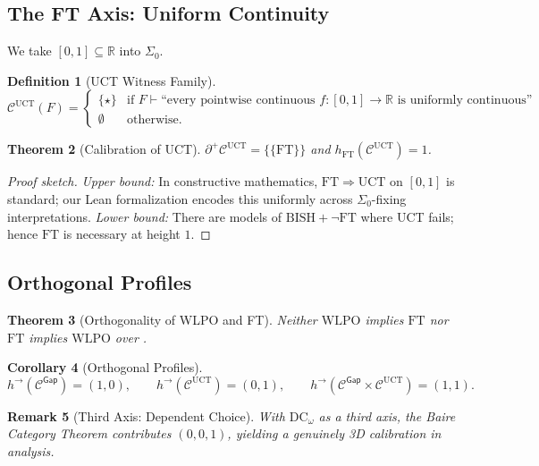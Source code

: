 \documentclass[11pt]{article}
\newtheorem{theorem}{Theorem}[section]
\newtheorem{definition}[theorem]{Definition}
\newtheorem{corollary}[theorem]{Corollary}
\newtheorem{remark}[theorem]{Remark}
\newcommand{\R}{\mathbb{R}}
\newcommand{\WLPO}{\mathrm{WLPO}}
\newcommand{\FT}{\mathrm{FT}}
\newcommand{\UCT}{\mathrm{UCT}}
\newcommand{\DCw}{\mathrm{DC}_\omega}
\newcommand{\BISH}{\mathrm{BISH}}
\newcommand{\SigmaZero}{\Sigma_{0}}
\newcommand{\Frontierpos}{\partial^{+}}
\begin{document}
\subsection{The FT Axis: Uniform Continuity}

We take $[0,1]\subseteq\R$ into $\SigmaZero$.

\begin{definition}[UCT Witness Family]
\[
\mathcal{C}^{\mathrm{UCT}}(F) =
\begin{cases}
\{\star\} & \text{if } F \vdash \text{``every pointwise continuous } f:[0,1]\to\R \text{ is uniformly continuous''} \\
\emptyset & \text{otherwise.}
\end{cases}
\]
\end{definition}

\begin{theorem}[Calibration of UCT]\label{thm:uct-calibration}
$\Frontierpos\mathcal{C}^{\mathrm{UCT}} = \{\{\FT\}\}$ and $h_{\FT}(\mathcal{C}^{\mathrm{UCT}})=1$.
\end{theorem}
\begin{proof}[Proof sketch]
\emph{Upper bound:} In constructive mathematics, $\FT\Rightarrow \UCT$ on $[0,1]$ is standard; our Lean formalization encodes this uniformly across $\SigmaZero$-fixing interpretations. \emph{Lower bound:} There are models of $\BISH+\neg\FT$ where UCT fails; hence $\FT$ is necessary at height $1$.
\end{proof}

\subsection{Orthogonal Profiles}

\begin{theorem}[Orthogonality of WLPO and FT]
Neither $\WLPO$ implies $\FT$ nor $\FT$ implies $\WLPO$ over \BISH.
\end{theorem}

\begin{corollary}[Orthogonal Profiles]\label{cor:orthogonal}
\[
h^{\to}(\mathcal{C}^{\mathsf{Gap}})=(1,0),\qquad
h^{\to}(\mathcal{C}^{\mathrm{UCT}})=(0,1),\qquad
h^{\to}(\mathcal{C}^{\mathsf{Gap}}\times \mathcal{C}^{\mathrm{UCT}})=(1,1).
\]
\end{corollary}

\begin{remark}[Third Axis: Dependent Choice]
With $\DCw$ as a third axis, the Baire Category Theorem contributes $(0,0,1)$, yielding a genuinely 3D calibration in analysis.
\end{remark}
\end{document}
